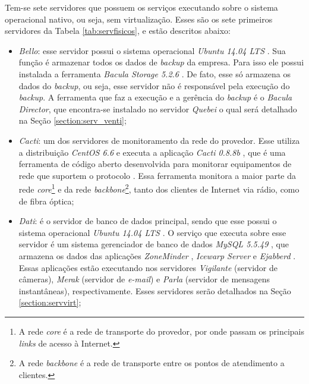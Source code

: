 Tem-se sete servidores que possuem os serviços executando sobre o sistema operacional nativo, ou seja, sem virtualização. 
Esses são os sete primeiros servidores da Tabela \ref{tab:servfisicos}, e estão descritos abaixo:
\begin{itemize}
 \item \textit{Bello}: esse servidor possui o sistema operacional \textit{Ubuntu 14.04 \ac{LTS}} \cite{ubuntu}. Sua função é armazenar todos os 
 dados de \textit{backup} da empresa. Para isso ele possui instalada a ferramenta \textit{Bacula Storage 5.2.6} \cite{bacula}. De fato, esse só
 armazena os dados do \textit{backup}, ou seja, esse servidor não é responsável pela execução do \textit{backup}. A ferramenta que faz a execução e
 a gerência do \textit{backup} é o \textit{Bacula Director}, que encontra-se instalado no servidor \textit{Quebei} o qual será detalhado na 
 Seção \ref{section:serv_venti};
 
 \item \textit{Cacti}: um dos servidores de monitoramento da rede do provedor. Esse utiliza a distribuição \textit{CentOS 6.6} \cite{centos} e 
 executa a aplicação \textit{Cacti 0.8.8b} \cite{cacti}, que é uma ferramenta de código aberto desenvolvida para monitorar equipamentos de rede 
 que suportem o protocolo  \cite{kurose2006}. Essa ferramenta monitora a maior parte da rede 
 \textit{core}\footnote[1]{A rede \textit{core} é a rede de transporte do provedor, por onde passam os principais \textit{links} de acesso à 
 Internet.} e da rede \textit{backbone}\footnote[2]{A rede \textit{backbone} é a rede de transporte entre os pontos de atendimento a clientes.}, 
 tanto dos clientes de Internet via rádio, como de fibra óptica;
 
 \item \textit{Dati}: é o servidor de banco de dados principal, sendo que esse possui o sistema operacional \textit{Ubuntu 14.04 \ac{LTS}} 
 \cite{ubuntu}. O serviço que executa sobre esse servidor é um sistema gerenciador de banco de dados \textit{MySQL 5.5.49} \cite{mysql}, que 
 armazena os dados das aplicações \textit{ZoneMinder} \cite{zoneminder}, \textit{Icewarp Server} \cite{icewarp} e \textit{Ejabberd} \cite{ejabberd}. 
 Essas aplicações estão executando nos servidores \textit{Vigilante} (servidor de câmeras), \textit{Merak} (servidor de \textit{e-mail}) e 
 \textit{Parla} (servidor de mensagens instantâneas), respectivamente. Esses servidores serão detalhados na Seção \ref{section:servvirt};
 

\end{itemize}
